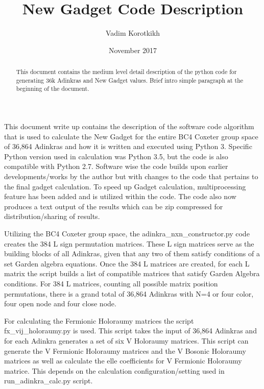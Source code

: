 \documentclass[12pt, letterpaper]{article}
\title{New Gadget Code Description}
\author{Vadim Korotkikh}
\date{November 2017}
\begin{document}
\maketitle

\begin{abstract}
This document contains the medium level detail description of the python code
for generating 36k Adinkras and New Gadget values. Brief intro simple paragraph
at the beginning of the document.
\end{abstract}

This document write up contains the description of the software code algorithm
that is used to calculate the New Gadget for the entire BC4 Coxeter group space
of 36,864 Adinkras and how it is written and executed using Python 3.
Specific Python version used in calculation was Python 3.5, but the code is also
compatible with Python 2.7.
Software wise the code builds upon earlier developments/works by the author but
with changes to the code that pertains to the final gadget calculation.
To speed up Gadget calculation, multiprocessing feature has been added and is
utilized within the code. The code also now produces a text output of the
results which can be zip compressed for distribution/sharing of results.\par
Utilizing the BC4 Coxeter group space, the adinkra{\_}nxn{\_}constructor.py
code creates the 384 L sign permutation matrices. These L sign matrices serve as the building
blocks of all Adinkras, given that any two of them satisfy conditions of a set Garden algebra
equations. Once the 384 L matrices are created, for each L matrix the script builds a list of
compatible matrices that satisfy Garden Algebra conditions. For 384 L matrices, counting all
possible matrix position permutations, there is a grand total of 36,864 Adinkras with N=4 or
four color, four open node and four close node.\par
For calculating the Fermionic Holoraumy matrices the script fx{\_}vij{\_}holoraumy.py is used.
This script takes the input of 36,864 Adinkras and for each Adinkra generates a set of six
V Holoraumy matrices. This script can generate the V Fermionic Holoraumy matrices and the V
Bosonic Holoraumy matrices as well as calculate the elle coefficients for V Fermionic Holoraumy
matrice. This depends on the calculation configuration/setting used in run{\_}adinkra{\_}calc.py
script.
\end{document}
